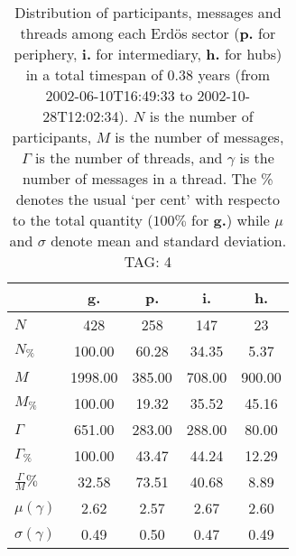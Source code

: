 \begin{table}[h!]
\begin{center}
\begin{tabular}{| l || c | c | c | c |}\hline
 & {\bf g.} & {\bf p.} & {\bf i.} & {\bf h.} \\\hline\hline
$N$ & 428  & 258  & 147  & 23 \\
$N_{\%}$ & 100.00  & 60.28  & 34.35  & 5.37 \\\hline
$M$ & 1998.00  & 385.00  & 708.00  & 900.00 \\
$M_{\%}$ & 100.00  & 19.32  & 35.52  & 45.16 \\\hline
$\Gamma$ & 651.00  & 283.00  & 288.00  & 80.00 \\
$\Gamma_{\%}$ & 100.00  & 43.47  & 44.24  & 12.29 \\\hline
$\frac{\Gamma}{M}\%$ & 32.58  & 73.51  & 40.68  & 8.89 \\
$\mu(\gamma)$ & 2.62  & 2.57  & 2.67  & 2.60 \\
$\sigma(\gamma)$ & 0.49  & 0.50  & 0.47  & 0.49 \\\hline
\end{tabular}
\caption{Distribution of participants, messages and threads among each Erd\"os sector ({\bf p.} for periphery, {\bf i.} for intermediary, 
    {\bf h.} for hubs) in a total timespan of 0.38 years (from 2002-06-10T16:49:33 to 2002-10-28T12:02:34). $N$ is the number of participants, $M$ is the number of messages, $\Gamma$ is the number of threads, and $\gamma$ is the number of messages in a thread.
    The \% denotes the usual `per cent' with respecto to the total quantity ($100\%$ for {\bf g.})
    while $\mu$ and $\sigma$ denote mean and standard deviation. TAG: 4}
\end{center}
\end{table}
